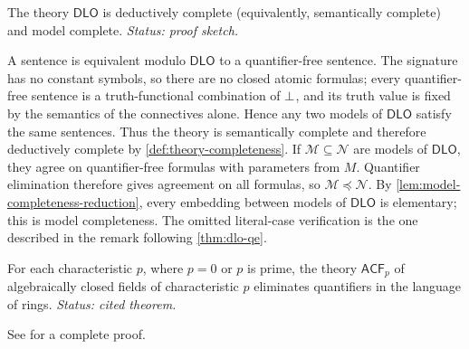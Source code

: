 \begin{corollary}
The theory \(\mathsf{DLO}\) is deductively complete (equivalently,
semantically complete) and model complete.
\textit{Status: proof sketch.}
\end{corollary}

\begin{proofplan}
A sentence is equivalent modulo \(\mathsf{DLO}\) to a quantifier-free sentence.
The signature has no constant symbols, so there are no closed atomic
formulas; every quantifier-free sentence is a truth-functional combination
of \(\bot\), and its truth value is fixed by the semantics of the
connectives alone.  Hence any two models of
\(\mathsf{DLO}\) satisfy the same sentences.  Thus the theory is semantically
complete and therefore deductively complete by
\cref{def:theory-completeness}.
If \(\mathcal M\subseteq\mathcal N\) are models of \(\mathsf{DLO}\), they agree
on quantifier-free formulas with parameters from \(M\).  Quantifier elimination
therefore gives agreement on all formulas, so
\(\mathcal M\preccurlyeq\mathcal N\).  By
\cref{lem:model-completeness-reduction}, every embedding between models
of \(\mathsf{DLO}\) is elementary; this is model completeness.
The omitted literal-case verification is the one described in the remark
following \cref{thm:dlo-qe}.
\end{proofplan}

\begin{theorem}
For each characteristic \(p\), where \(p=0\) or \(p\) is prime, the theory
\(\mathsf{ACF}_p\) of algebraically closed fields of characteristic \(p\)
eliminates quantifiers in the language of rings.
\textit{Status: cited theorem.}
\end{theorem}

See \cite{Marker2002} for a complete proof.

